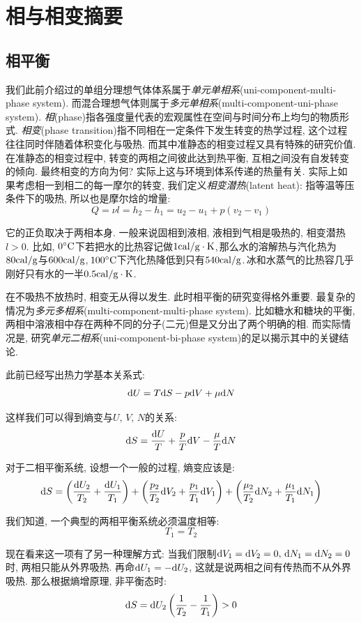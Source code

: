 \chapter{相与相变摘要}


\section{相平衡}

我们此前介绍过的单组分理想气体体系属于\emph{单元单相系}(uni-component-multi-phase system). 而混合理想气体则属于\emph{多元单相系}(multi-component-uni-phase system). \emph{相}(phase)指各强度量代表的宏观属性在空间与时间分布上均匀的物质形式. \emph{相变}(phase transition)指不同相在一定条件下发生转变的热学过程, 这个过程往往同时伴随着体积变化与吸热. 而其中准静态的相变过程又具有特殊的研究价值. 在准静态的相变过程中, 转变的两相之间彼此达到热平衡, 互相之间没有自发转变的倾向. 最终相变的方向为何? 实际上这与环境到体系传递的热量有关. 实际上如果考虑相一到相二的每一摩尔的转变, 我们定义\emph{相变潜热}(latent heat): 指等温等压条件下的吸热, 所以也是摩尔焓的增量:
\[Q=\nu l=h_2-h_1=u_2-u_1+p(v_2-v_1)\]

它的正负取决于两相本身. 一般来说固相到液相, 液相到气相是吸热的, 相变潜热$l>0$. 比如, $0^\circ \mathrm{C}$下若把水的比热容记做$1{\rm cal/g\cdot K}$,\,那么水的溶解热与汽化热为$80{\rm cal/g}$与$600{\rm cal/g}$,\,$100^\circ \mathrm{C}$下汽化热降低到只有$540{\rm cal/g}$.\,冰和水蒸气的比热容几乎刚好只有水的一半$0.5{\rm cal/g\cdot K}$.

在不吸热不放热时, 相变无从得以发生. 此时相平衡的研究变得格外重要. 最复杂的情况为\emph{多元多相系}(multi-component-multi-phase system). 比如糖水和糖块的平衡, 两相中溶液相中存在两种不同的分子(二元)但是又分出了两个明确的相. 而实际情况是, 研究\emph{单元二相系}(uni-component-bi-phase system)的足以揭示其中的关键结论.

此前已经写出热力学基本关系式:
\[\textrm{d} U=T\textrm{d} S-p\textrm{d} V+\mu \textrm{d} N\]

这样我们可以得到熵变与$U,\,V,\,N$的关系:
\[\textrm{d} S=\frac{\textrm{d} U}{T}+\frac{p}{T}\textrm{d} V -\frac{\mu}{T}\textrm{d} N\]

对于二相平衡系统, 设想一个一般的过程, 熵变应该是:
\[\textrm{d} S=\left(\frac{\textrm{d} U_2}{T_2}+\frac{\textrm{d} U_1}{T_1}\right)+\left(\frac{p_2}{T_2}\textrm{d} V_2+\frac{p_1}{T_1}\textrm{d} V_1\right)+\left(\frac{\mu_2}{T_2}\textrm{d} N_2+\frac{\mu_1}{T_1}\textrm{d} N_1\right)\]

我们知道, 一个典型的两相平衡系统必须温度相等:
\[T_1=T_2\]

现在看来这一项有了另一种理解方式: 当我们限制$\textrm{d} V_1=\textrm{d} V_2=0,\,\textrm{d} N_1=\textrm{d} N_2=0$时, 两相只能从外界吸热. 再命$\textrm{d} U_1=-\textrm{d} U_2$, 这就是说两相之间有传热而不从外界吸热. 那么根据熵增原理, 非平衡态时:
\[\textrm{d} S=\textrm{d} U_2\left(\frac{1}{T_2}-\frac{1}{T_1}\right)>0\]

